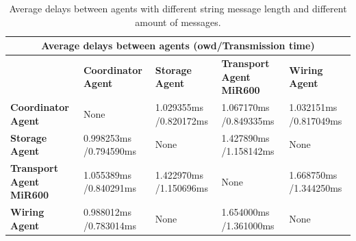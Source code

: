 \begin{table}[htbp]
    \small
    \centering
    \caption{Average delays between agents with different string message length and 
    different amount of messages.}
    \label{tab: mean-usecase-time}
    \begin{tabular}{|m{}|m{}|m{}|m{}|m{}|}
    \hline
    \multicolumn{5}{|c|}{\textbf{Average delays between agents (\gls{owd}/Transmission time)}}                                                            \\ \hline
    \textbf{}                         & \textbf{Coordinator Agent}             & \textbf{Storage Agent}        & \textbf{Transport Agent MiR600}    & \textbf{Wiring Agent}\\ \hline
    \textbf{Coordinator Agent}      & None                  & 1.029355ms /0.820172ms & 1.067170ms /0.849335ms  & 1.032151ms /0.817049ms \\ \hline
    \textbf{Storage Agent}          & 0.998253ms /0.794590ms & None                  & 1.427890ms /1.158142ms  & None                  \\ \hline
    \textbf{Transport Agent MiR600} & 1.055389ms /0.840291ms & 1.422970ms /1.150696ms & None                   & 1.668750ms /1.344250ms \\ \hline
    \textbf{Wiring Agent}           & 0.988012ms /0.783014ms & None                  & 1.654000ms /1.361000ms  & None                  \\ \hline
    \end{tabular}
\end{table}


